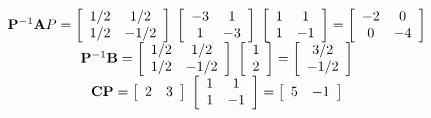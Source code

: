 \[
\begin{array}{c}
 {\bf{P}}^{ - 1} {\bf{A}}P = \left[ {\begin{array}{*{20}c}
   {{1 \mathord{\left/
 {\vphantom {1 2}} \right.
 \kern-\nulldelimiterspace} 2}} & {{1 \mathord{\left/
 {\vphantom {1 2}} \right.
 \kern-\nulldelimiterspace} 2}}  \\
   {{1 \mathord{\left/
 {\vphantom {1 2}} \right.
 \kern-\nulldelimiterspace} 2}} & { - {1 \mathord{\left/
 {\vphantom {1 2}} \right.
 \kern-\nulldelimiterspace} 2}}  \\
\end{array}} \right]\;\left[ {\begin{array}{*{20}c}
   { - 3} & 1  \\
   1 & { - 3}  \\
\end{array}} \right]\;\left[ {\begin{array}{*{20}c}
   1 & 1  \\
   1 & { - 1}  \\
\end{array}} \right] = \left[ {\begin{array}{*{20}c}
   { - 2} & 0  \\
   0 & { - 4}  \\
\end{array}} \right] \\ 
 {\bf{P}}^{ - 1} {\bf{B}} = \left[ {\begin{array}{*{20}c}
   {{1 \mathord{\left/
 {\vphantom {1 2}} \right.
 \kern-\nulldelimiterspace} 2}} & {{1 \mathord{\left/
 {\vphantom {1 2}} \right.
 \kern-\nulldelimiterspace} 2}}  \\
   {{1 \mathord{\left/
 {\vphantom {1 2}} \right.
 \kern-\nulldelimiterspace} 2}} & { - {1 \mathord{\left/
 {\vphantom {1 2}} \right.
 \kern-\nulldelimiterspace} 2}}  \\
\end{array}} \right]\;\left[ {\begin{array}{*{20}c}
   1  \\
   2  \\
\end{array}} \right] = \left[ {\begin{array}{*{20}c}
   {{3 \mathord{\left/
 {\vphantom {3 2}} \right.
 \kern-\nulldelimiterspace} 2}}  \\
   { - {1 \mathord{\left/
 {\vphantom {1 2}} \right.
 \kern-\nulldelimiterspace} 2}}  \\
\end{array}} \right] \\ 
 {\bf{CP}} = \left[ {\begin{array}{*{20}c}
   2 & 3  \\
\end{array}} \right]\;\left[ {\begin{array}{*{20}c}
   1 & 1  \\
   1 & { - 1}  \\
\end{array}} \right] = \left[ {\begin{array}{*{20}c}
   5 & { - 1}  \\
\end{array}} \right] \\ 
 \end{array}
\]
